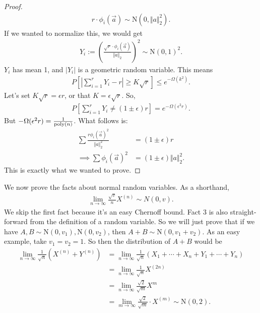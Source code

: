 \documentclass{report}
\begin{document}
\begin{proof}
    \begin{align*}
        r \cdot \phi_i(\vec a) \sim \mathrm N(0, \Vert a \Vert_2^2).
    \end{align*}
    If we wanted to normalize this, we would get 
    \begin{align*}
        Y_i := \left(\frac{\sqrt r \cdot \phi_i(\vec a)}{\Vert a \Vert_2}\right)^2 \sim \mathrm N(0, 1)^2.
    \end{align*}
    $Y_i$ has mean 1, and $|Y_i|$ is a geometric random variable. This means
    \begin{align*}
        P\left[\left| \sum_{i=1}^r Y_i - r \right| \geq K \sqrt r \right] \leq e^{-\Omega(k^2)}.
    \end{align*}
    Let's set $K\sqrt r = \epsilon r$, or that $K = \epsilon \sqrt r$. So,
    \begin{align*}
        P\left[\sum_{i=1}^r Y_i \neq (1 \pm \epsilon)r \right] = e^{-\Omega(\epsilon^2 r)}.
    \end{align*}
    But $-\Omega(\epsilon^2 r) = \frac{1}{\text{poly}(n)}$. What follows is:
    \begin{align*}
        \sum \frac{r \phi_i(\vec a)^2}{\Vert a \Vert_2^2} &= (1 \pm \epsilon) r \\
        \implies \sum \phi_i(\vec a)^2 &= (1 \pm \epsilon) \Vert a \Vert_2^2.
    \end{align*}
    This is exactly what we wanted to prove. 
\end{proof}
\newpage
\noindent We now prove the facts about normal random variables. 
\noindent As a shorthand, 
\begin{align*}
    \lim_{n\to\infty} \frac{\sqrt v}{n}X^{(n)} \sim N(0, v).
\end{align*}
We skip the first fact because it's an easy Chernoff bound. Fact 3 is also straight-forward from the definition of a random variable. So we will just prove that if we have $A, B\sim \mathrm N(0, v_1), \mathrm N(0, v_2)$, then $A+ B \sim \mathrm N(0, v_1 + v_2)$. As an easy example, take $v_1 = v_2 = 1$. So then the distribution of $A+  B$ would be 
\begin{align*}
    \lim_{n \to \infty} \frac{1}{\sqrt n} (X^{(n)} + Y^{(n)})  &= \lim_{n \to \infty} \frac{1}{\sqrt n} ( X_1 + \cdots + X_n + Y_1 + \cdots + Y_n) \\
    &= \lim_{n \to \infty} \frac{1}{\sqrt n} X^{(2n)} \\
    &= \lim_{n \to \infty} \frac{\sqrt 2}{\sqrt m} X^{m} \tag{where $m = 2n$} \\
    &= \lim_{m \to \infty} \frac{\sqrt 2}{\sqrt m} \cdot X^{(m)} \sim \mathrm N(0, 2). 
\end{align*}
\end{document}
